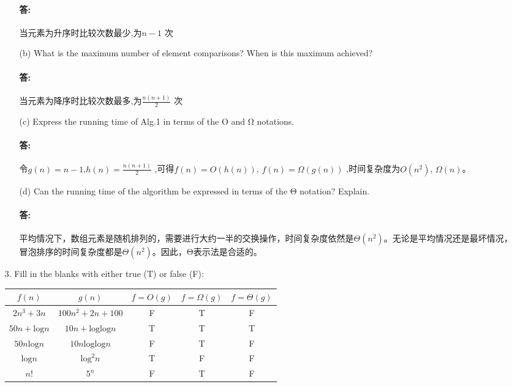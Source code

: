 \documentclass{article}
\begin{document}
\begin{itemize}
\begin{itemize}
\paragraph{答:}当元素为升序时比较次数最少,为$n - 1$ 次

\item[(b)] What is the maximum number of element comparisons? When is this maximum achieved?

\paragraph{答:}当元素为降序时比较次数最多,为$ \frac{n(n+1)}{2} $ 次

\item[(c)] Express the running time of Alg.1 in terms of the Ο and Ω notations.

\paragraph{答:} 令$g(n) = n - 1$,$h(n) =  \frac{n(n+1)}{2} $ ,可得$f(n) = O(h(n))$, $f(n) = \Omega(g(n))$
,时间复杂度为$O(n^2)$,
$\Omega(n)$。
\item[(d)] Can the running time of the algorithm be expressed in terms of the Θ notation? Explain.

\paragraph{答:} 平均情况下，数组元素是随机排列的，需要进行大约一半的交换操作，时间复杂度依然是$Θ(n^2)$。无论是平均情况还是最坏情况，冒泡排序的时间复杂度都是$Θ(n^2)$。因此，Θ表示法是合适的。
\end{itemize}



\item[3.] Fill in the blanks with either true (T) or false (F):

  \begin{center}
    \begin{tabular}{|c|c|c|c|c|} 
    \hline
    $f(n)$ & $g(n)$ & $f=O(g) $ &$f=\Omega(g)$  &$f=\Theta(g)$ \\
    \hline\hline
    $2n^3+3n$ & $100n^2 + 2n +100$ &F &T&F \\\hline
    $50n + \mbox{log}n $ & $10n+\mbox{log}\mbox{log}n$ &T &T& T\\\hline
    $50n\mbox{log}n$ & $10n\mbox{log}\mbox{log}n$ & F&T& F\\\hline
    $\mbox{log}n$ & $\mbox{log}^2n$ &T &F&F \\\hline
    $n!$ & $5^n$ &F  &T&F\\
    \hline
    \end{tabular}
  \end{center}



\end{itemize}
\end{document}

